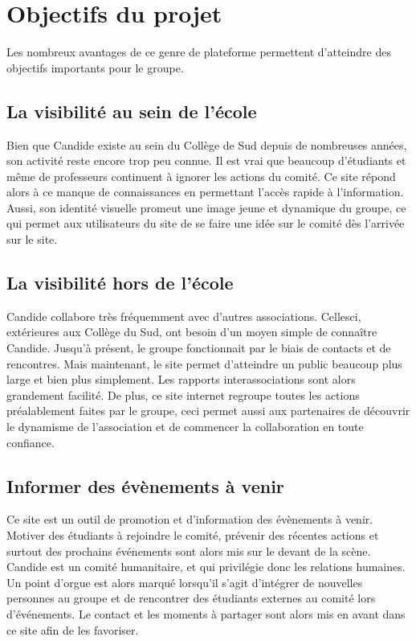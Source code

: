 \documentclass[a4,10pt,french]{sphinxmanual}
\begin{document}
\section{Objectifs du projet}
\label{\detokenize{introduction:objectifs-du-projet}}
\sphinxAtStartPar
Les nombreux avantages de ce genre de plateforme permettent d’atteindre des objectifs importants pour le groupe.


\subsection{La visibilité au sein de l’école}
\label{\detokenize{introduction:la-visibilite-au-sein-de-lecole}}
\sphinxAtStartPar
Bien que Candide existe au sein du Collège de Sud depuis de nombreuses années, son activité reste encore trop peu connue. Il est vrai que beaucoup d’étudiants et même de professeurs continuent à ignorer les actions du comité. Ce site répond alors à ce manque de connaissances en permettant l’accès rapide à l’information. Aussi, son identité visuelle promeut une image jeune et dynamique du groupe, ce qui permet aux utilisateurs du site de se faire une idée sur le comité dès l’arrivée sur le site.


\subsection{La visibilité hors de l’école}
\label{\detokenize{introduction:la-visibilite-hors-de-lecole}}
\sphinxAtStartPar
Candide collabore très fréquemment avec d’autres associations. Celles\sphinxhyphen{}ci, extérieures aux Collège du Sud, ont besoin d’un moyen simple de connaître Candide. Jusqu’à présent, le groupe fonctionnait par le biais de contacts et de rencontres. Mais maintenant, le site permet d’atteindre un public beaucoup plus large et bien plus simplement. Les rapports inter\sphinxhyphen{}associations sont alors grandement facilité. De plus, ce site internet regroupe toutes les actions préalablement faites par le groupe, ceci permet aussi aux partenaires  de découvrir le dynamisme de l’association et de commencer la collaboration en toute confiance.


\subsection{Informer des évènements à venir}
\label{\detokenize{introduction:informer-des-evenements-a-venir}}
\sphinxAtStartPar
Ce site est un outil de promotion et d’information des évènements à venir. Motiver des étudiants à rejoindre le comité, prévenir des récentes actions et surtout des prochains événements sont alors mis sur le devant de la scène. Candide est un comité humanitaire, et qui privilégie donc les relations humaines. Un point d’orgue est alors marqué lorsqu’il s’agit d’intégrer de nouvelles personnes au groupe et de rencontrer des étudiants externes au comité lors d’événements. Le contact et les moments à partager sont alors mis en avant dans ce site afin de les favoriser.
\end{document}
